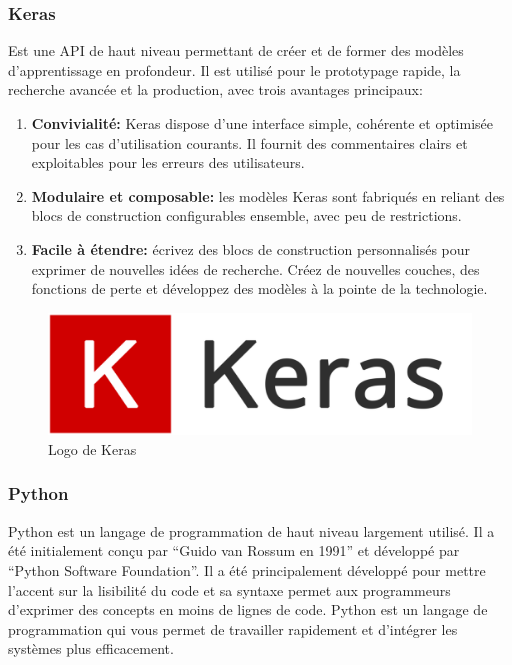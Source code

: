 \documentclass[12pt]{article}
\begin{document}
\subsubsection*{Keras}
Est une API de haut niveau permettant de créer et de former des modèles d'apprentissage en profondeur. Il est utilisé pour le prototypage rapide, la recherche avancée et la production, avec trois avantages principaux:
\begin{enumerate}
	\item \textbf{Convivialité:} Keras dispose d'une interface simple, cohérente et optimisée pour les cas d'utilisation courants. Il fournit des commentaires clairs et exploitables pour les erreurs des utilisateurs.
	\item \textbf{Modulaire et composable:} les modèles Keras sont fabriqués en reliant des blocs de construction configurables ensemble, avec peu de restrictions.
	\item \textbf{Facile à étendre:} écrivez des blocs de construction personnalisés pour exprimer de nouvelles idées de recherche. Créez de nouvelles couches, des fonctions de perte et développez des modèles à la pointe de la technologie.
\end{enumerate}

\begin{figure}[h]
	\centering
	\includegraphics[width=12cm]{img-Chapiter-4/keras.png}
	\caption{Logo de Keras}
\end{figure}

\subsubsection*{Python}
Python est un langage de programmation de haut niveau largement utilisé. Il a été initialement conçu par “Guido van Rossum en 1991” et développé par “Python Software Foundation”. Il a été principalement développé pour mettre l'accent sur la lisibilité du code et sa syntaxe permet aux programmeurs d'exprimer des concepts en moins de lignes de code. Python est un langage de programmation qui vous permet de travailler rapidement et d’intégrer les systèmes plus efficacement.
\end{document}
